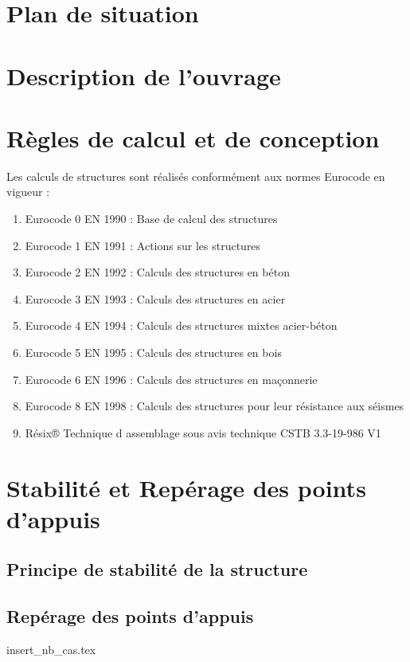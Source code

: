 \documentclass{rSIMONIN} %
\begin{document}
\section{Plan de situation}

\section{Description de l'ouvrage}

\section{Règles de calcul et de conception}

Les calculs de structures sont réalisés conformément aux normes Eurocode en vigueur :
\begin{enumerate}
    \item Eurocode 0 EN 1990 : Base de calcul des structures
    \item Eurocode 1 EN 1991 : Actions sur les structures
    \item Eurocode 2 EN 1992 : Calculs des structures en béton
    \item Eurocode 3 EN 1993 : Calculs des structures en acier
    \item Eurocode 4 EN 1994 : Calculs des structures mixtes acier-béton
    \item Eurocode 5 EN 1995 : Calculs des structures en bois
    \item Eurocode 6 EN 1996 : Calculs des structures en maçonnerie
    \item Eurocode 8 EN 1998 : Calculs des structures pour leur résistance aux séismes
    \item Résix® Technique d assemblage sous avis technique CSTB 3.3-19-986 V1
\end{enumerate}



\section{Stabilité et Repérage des points d'appuis}
\subsection{Principe de stabilité de la structure}

\subsection{Repérage des points d'appuis}

\tt %



{insert_nb_cas.tex}

\newpage
{

    \listoffigures

    \listoftables
}
\end{document}
